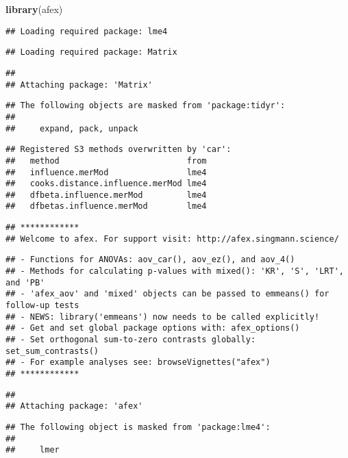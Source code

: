 \documentclass[]{article}
\newenvironment{Shaded}{\begin{snugshade}}{\end{snugshade}}
\newcommand{\KeywordTok}[1]{\textcolor[rgb]{0.13,0.29,0.53}{\textbf{#1}}}
\newcommand{\NormalTok}[1]{#1}
\begin{document}
\begin{Shaded}
\begin{Highlighting}[]
\KeywordTok{library}\NormalTok{(afex)}
\end{Highlighting}
\end{Shaded}

\begin{verbatim}
## Loading required package: lme4
\end{verbatim}

\begin{verbatim}
## Loading required package: Matrix
\end{verbatim}

\begin{verbatim}
## 
## Attaching package: 'Matrix'
\end{verbatim}

\begin{verbatim}
## The following objects are masked from 'package:tidyr':
## 
##     expand, pack, unpack
\end{verbatim}

\begin{verbatim}
## Registered S3 methods overwritten by 'car':
##   method                          from
##   influence.merMod                lme4
##   cooks.distance.influence.merMod lme4
##   dfbeta.influence.merMod         lme4
##   dfbetas.influence.merMod        lme4
\end{verbatim}

\begin{verbatim}
## ************
## Welcome to afex. For support visit: http://afex.singmann.science/
\end{verbatim}

\begin{verbatim}
## - Functions for ANOVAs: aov_car(), aov_ez(), and aov_4()
## - Methods for calculating p-values with mixed(): 'KR', 'S', 'LRT', and 'PB'
## - 'afex_aov' and 'mixed' objects can be passed to emmeans() for follow-up tests
## - NEWS: library('emmeans') now needs to be called explicitly!
## - Get and set global package options with: afex_options()
## - Set orthogonal sum-to-zero contrasts globally: set_sum_contrasts()
## - For example analyses see: browseVignettes("afex")
## ************
\end{verbatim}

\begin{verbatim}
## 
## Attaching package: 'afex'
\end{verbatim}

\begin{verbatim}
## The following object is masked from 'package:lme4':
## 
##     lmer
\end{verbatim}
\end{document}
